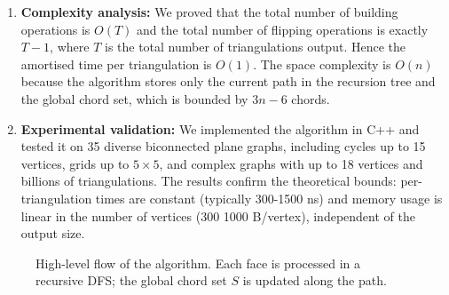 \begin{enumerate}
    \item \textbf{Complexity analysis:} 
    We proved that the total number of building operations is \(O(T)\) and the total number of flipping operations is exactly \(T-1\), where \(T\) is the total number of triangulations output. 
    Hence the amortised time per triangulation is \(O(1)\). 
    The space complexity is \(O(n)\) because the algorithm stores only the current path in the recursion tree and the global chord set, which is bounded by \(3n-6\) chords.
    
    \item \textbf{Experimental validation:} 
    We implemented the algorithm in C++ and tested it on 35 diverse biconnected plane graphs, including cycles up to 15 vertices, grids up to \(5\times5\), and complex graphs with up to 18 vertices and billions of triangulations. 
    The results confirm the theoretical bounds: per-triangulation times are constant (typically 300-1500 ns) and memory usage is linear in the number of vertices (300 1000 B/vertex), independent of the output size.
\end{enumerate}

\begin{figure}[htbp]
    \centering
    \caption{High-level flow of the algorithm. Each face is processed in a recursive DFS; the global chord set \(S\) is updated along the path.}
    \label{fig:algorithm_flow}
\end{figure}

